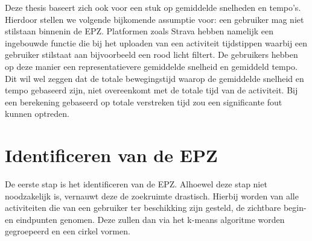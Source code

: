 Deze thesis baseert zich ook voor een stuk op gemiddelde snelheden en tempo's.
Hierdoor stellen we volgende bijkomende assumptie voor: een gebruiker mag niet
stilstaan binnenin de \ac{EPZ}. Platformen zoals Strava hebben namelijk een
ingebouwde functie die bij het uploaden van een activiteit tijdstippen waarbij
een gebruiker stilstaat aan bijvoorbeeld een rood licht filtert. De gebruikers
hebben op deze manier een representatievere gemiddelde snelheid en gemiddeld
tempo. Dit wil wel zeggen dat de totale bewegingstijd waarop de gemiddelde
snelheid en tempo gebaseerd zijn, niet overeenkomt met de totale tijd van de
activiteit. Bij een berekening gebaseerd op totale verstreken tijd zou een
significante fout kunnen optreden.

\section{Identificeren van de EPZ}
De eerste stap is het identificeren van de \ac{EPZ}. Alhoewel deze stap niet
noodzakelijk is, vernauwt deze de zoekruimte drastisch. Hierbij worden van alle
activiteiten die van een gebruiker ter beschikking zijn gesteld, de zichtbare
begin- en eindpunten genomen. Deze zullen dan via het k-means algoritme worden
gegroepeerd en een cirkel vormen.

